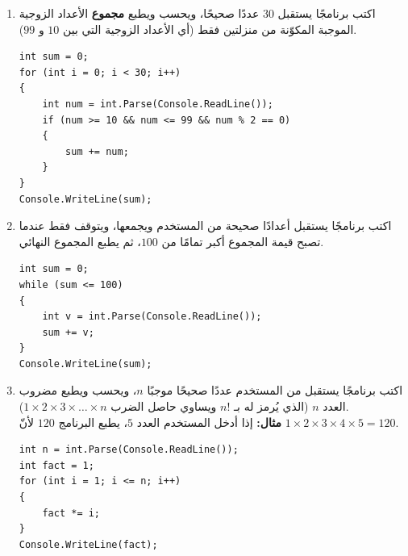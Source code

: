 \documentclass[14pt]{extarticle}
\begin{document}
\begin{enumerate}[resume, itemsep=1em]
\item اكتب برنامجًا يستقبل $30$ عددًا صحيحًا، ويحسب ويطبع \textbf{مجموع} الأعداد الزوجية الموجبة المكوّنة من منزلتين فقط (أي الأعداد الزوجية التي بين $10$ و $99$).
\ifwithsols
\begin{boxSolution}
\begin{english}
\begin{verbatim}
int sum = 0;
for (int i = 0; i < 30; i++)
{
    int num = int.Parse(Console.ReadLine());
    if (num >= 10 && num <= 99 && num % 2 == 0)
    {
        sum += num;
    }
}
Console.WriteLine(sum);
\end{verbatim}
\end{english}
\end{boxSolution}
\fi
\filbreak

\item اكتب برنامجًا يستقبل أعدادًا صحيحة من المستخدم ويجمعها، ويتوقف فقط عندما تصبح قيمة المجموع أكبر تمامًا من $100$، ثم يطبع المجموع النهائي.
\ifwithsols
\begin{boxSolution}
\begin{english}
\begin{verbatim}
int sum = 0;
while (sum <= 100)
{
    int v = int.Parse(Console.ReadLine());
    sum += v;
}
Console.WriteLine(sum);
\end{verbatim}
\end{english}
\end{boxSolution}
\fi
\filbreak

\item اكتب برنامجًا يستقبل من المستخدم عددًا صحيحًا موجبًا $n$، ويحسب ويطبع مضروب العدد $n$ (الذي يُرمز له بـ $n!$ ويساوي حاصل الضرب $1 \times 2 \times 3 \times \dots \times n$). \\
\textbf{مثال:} إذا أدخل المستخدم العدد $5$، يطبع البرنامج $120$ لأنّ $1 \times 2 \times 3 \times 4 \times 5 = 120$.
\ifwithsols
\begin{boxSolution}
\begin{english}
\begin{verbatim}
int n = int.Parse(Console.ReadLine());
int fact = 1;
for (int i = 1; i <= n; i++)
{
    fact *= i;
}
Console.WriteLine(fact);
\end{verbatim}
\end{english}
\end{boxSolution}
\fi
\filbreak

\end{enumerate}

\clearpage
\end{document}
